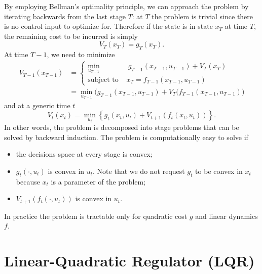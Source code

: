 By employing Bellman's optimality principle, we can approach the problem by iterating backwards from the last stage $T$: at $T$ the problem is trivial since there is no control input to optimize for. Therefore if the state is in state $x_T$ at time $T$, the remaining cost to be incurred is simply
\begin{equation*}
  V_T(x_T) = g_T(x_T).
\end{equation*}
At time $T-1$, we need to minimize
\begin{align*}
  V_{T-1}(x_{T-1}) &= \left\{
  \begin{aligned}
    \min_{u_{T-1}} &\ g_{T-1}(x_{T-1},u_{T-1}) + V_T(x_T) \\
    \text{subject to } & x_T = f_{T-1}(x_{T-1},u_{T-1})
  \end{aligned}
    \right. \\
  &= \min_{u_{T-1}} \big( g_{T-1}(x_{T-1},u_{T-1}) + V_T(f_{T-1}(x_{T-1},u_{T-1}) \big)
\end{align*}
and at a generic time $t$
\begin{equation}
  \label{eq:backward-induction}
  V_t(x_t) = \min_{u_t} \left\{ g_t(x_t,u_t) + V_{t+1}(f_t(x_t,u_t)) \right\}.
\end{equation}
In other words, the problem is decomposed into stage problems that can be solved by backward induction.
The problem is computationally easy to solve if
\begin{itemize}
\item the decisions space at every stage is convex;
\item $g_t(\cdot,u_t)$ is convex in $u_t$. Note that we do not request $g_t$ to be convex in $x_t$ because $x_t$ is a parameter of the problem;
\item $V_{t+1}(f_t(\cdot,u_t))$ is convex in $u_t$.
\end{itemize}
In practice the problem is tractable only for quadratic cost $g$ and linear dynamics $f$.


\section{Linear-Quadratic Regulator (LQR)}
\label{sec:lqr}

